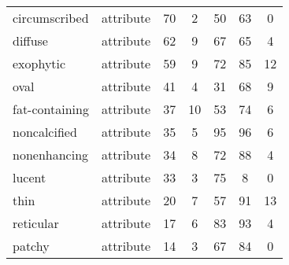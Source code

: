\documentclass[runningheads]{llncs}
\begin{document}
\begin{table}[]
\begin{tabular}{p{3.6cm}cccccc}
		circumscribed	&  attribute	& 70	& 2	& 50	& 63	& 0 \\
		diffuse	&  attribute	& 62	& 9	& 67	& 65	& 4 \\
		exophytic	&  attribute	& 59	& 9	& 72	& 85	& 12 \\
		oval	&  attribute	& 41	& 4	& 31	& 68	& 9 \\
		fat-containing	&  attribute	& 37	& 10	& 53	& 74	& 6 \\
		noncalcified	&  attribute	& 35	& 5	& 95	& 96	& 6 \\
		nonenhancing	&  attribute	& 34	& 8	& 72	& 88	& 4 \\
		lucent	&  attribute	& 33	& 3	& 75	& 8	& 0 \\
		thin	&  attribute	& 20	& 7	& 57	& 91	& 13 \\
		reticular	&  attribute	& 17	& 6	& 83	& 93	& 4 \\
		patchy	&  attribute	& 14	& 3	& 67	& 84	& 0 \\
		\hline
	\end{tabular}

\label{tbl:acc_per_tag3}
\end{table}


\end{document}
